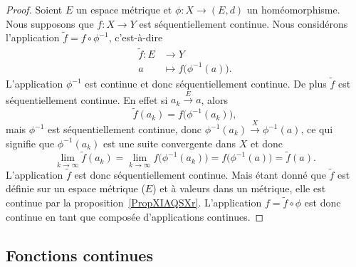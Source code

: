 \begin{proof}
	Soient \( E\) un espace métrique et \( \phi\colon X\to (E,d)\) un homéomorphisme. Nous supposons que \( f\colon X\to Y\) est séquentiellement continue. Nous considérons l'application \( \tilde f=f\circ\phi^{-1}\), c'est-à-dire
	\begin{equation}
		\begin{aligned}
			\tilde f\colon E & \to Y                              \\
			a                & \mapsto f\big( \phi^{-1}(a) \big).
		\end{aligned}
	\end{equation}
	L'application \( \phi^{-1}\) est continue et donc séquentiellement continue. De plus \( \tilde f\) est séquentiellement continue. En effet si \( a_k\stackrel{E}{\longrightarrow}a\), alors
	\begin{equation}
		\tilde f(a_k)=f\big( \phi^{-1}(a_k) \big),
	\end{equation}
	mais \( \phi^{-1}\) est séquentiellement continue, donc \( \phi^{-1}(a_k)\stackrel{X}{\longrightarrow}\phi^{-1}(a)\), ce qui signifie que \( \phi^{-1}(a_k)\) est une suite convergente dans \( X\) et donc
	\begin{equation}
		\lim_{k\to \infty} \tilde f(a_k)=\lim_{k\to \infty} f\big( \phi^{-1}(a_k) \big)=f\big( \phi^{-1}(a) \big)=\tilde f(a).
	\end{equation}
	L'application \( \tilde f\) est donc séquentiellement continue. Mais étant donné que \( \tilde f\) est définie sur un espace métrique (\( E\)) et à valeurs dans un métrique, elle est continue par la proposition~\ref{PropXIAQSXr}. L'application \( f=\tilde f\circ\phi\) est donc continue en tant que composée d'applications continues.
\end{proof}

\subsection{Fonctions continues}

